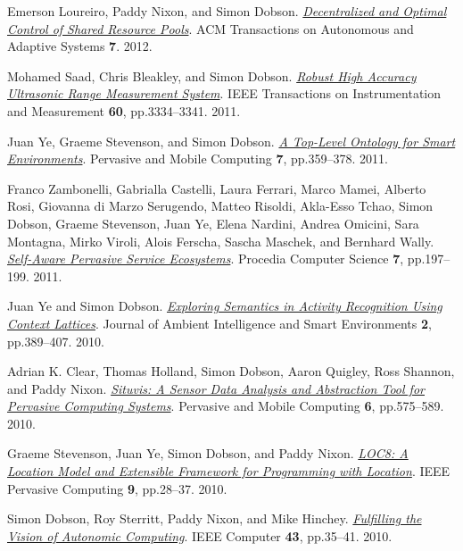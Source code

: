\documentclass[11pt]{article}
\begin{document}
\label{org2a74a88}Emerson Loureiro, Paddy Nixon, and Simon Dobson.  \emph{\href{https://dx.doi.org//10.1145/2168260.2168274}{Decentralized and Optimal Control of Shared Resource Pools}}. ACM Transactions on Autonomous and Adaptive Systems \textbf{7}. 2012.

\label{orgaf15579}Mohamed Saad, Chris Bleakley, and Simon Dobson.  \emph{\href{https://dx.doi.org//10.1109/TIM.2011.2128950}{Robust High Accuracy Ultrasonic Range Measurement System}}. IEEE Transactions on Instrumentation and Measurement \textbf{60}, pp.3334–3341. 2011.

\label{orgf6b99e2}Juan Ye, Graeme Stevenson, and Simon Dobson.  \emph{\href{https://dx.doi.org//10.1016/j.pmcj.2011.02.002}{A Top-Level Ontology for Smart Environments}}. Pervasive and Mobile Computing \textbf{7}, pp.359–378. 2011.

\label{org0f59336}Franco Zambonelli, Gabrialla Castelli, Laura Ferrari, Marco Mamei, Alberto Rosi, Giovanna di Marzo Serugendo, Matteo Risoldi, Akla-Esso Tchao, Simon Dobson, Graeme Stevenson, Juan Ye, Elena Nardini, Andrea Omicini, Sara Montagna, Mirko Viroli, Alois Ferscha, Sascha Maschek, and Bernhard Wally.  \emph{\href{https://dx.doi.org//10.1016/j.procs.2011.09.006}{Self-Aware Pervasive Service Ecosystems}}. Procedia Computer Science \textbf{7}, pp.197–199. 2011.

\label{org85190ad}Juan Ye and Simon Dobson.  \emph{\href{https://dx.doi.org//10.3233/AIS-2009-0082}{Exploring Semantics in Activity Recognition Using Context Lattices}}. Journal of Ambient Intelligence and Smart Environments \textbf{2}, pp.389–407. 2010.

\label{org80a6ba8}Adrian K. Clear, Thomas Holland, Simon Dobson, Aaron Quigley, Ross Shannon, and Paddy Nixon.  \emph{\href{https://dx.doi.org//10.1016/j.pmcj.2010.04.002}{Situvis: A Sensor Data Analysis and Abstraction Tool for Pervasive Computing Systems}}. Pervasive and Mobile Computing \textbf{6}, pp.575–589. 2010.

\label{orgdc6a119}Graeme Stevenson, Juan Ye, Simon Dobson, and Paddy Nixon.  \emph{\href{https://dx.doi.org//10.1109/MPRV.2009.90}{LOC8: A Location Model and Extensible Framework for Programming with Location}}. IEEE Pervasive Computing \textbf{9}, pp.28–37. 2010.

\label{org7847cad}Simon Dobson, Roy Sterritt, Paddy Nixon, and Mike Hinchey.  \emph{\href{https://dx.doi.org///10.1109/MC.2010.14}{Fulfilling the Vision of Autonomic Computing}}. IEEE Computer \textbf{43}, pp.35–41. 2010.
\end{document}

